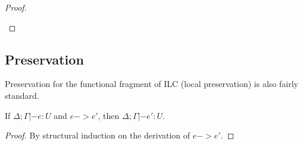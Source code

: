 \begin{theorem}[Progress]
\begin{proof}
\begin{itemize}[leftmargin=*]
\begin{llproof}
      \end{llproof}
    \end{itemize}    
\end{proof}  
\end{theorem}

\subsection{Preservation}

Preservation for the functional fragment of ILC (local preservation) is also
fairly standard.

\begin{theorem}
  If $\Delta; \Gamma|- e : U$ and $e -> e'$, then $\Delta; \Gamma|- e' : U$.
  \begin{proof}
    By structural induction on the derivation of $e -> e'$.
  \end{proof}
\end{theorem}

